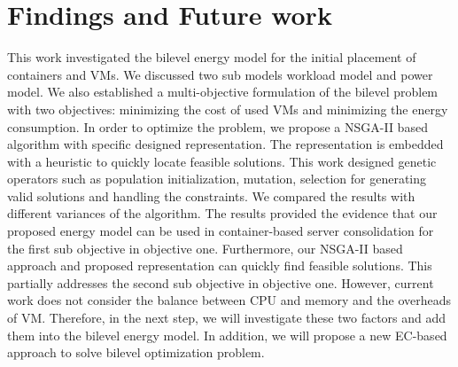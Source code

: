 \section{Findings and Future work}
\label{sec:con}

This work investigated the bilevel energy model for the initial placement of containers and VMs. We discussed two sub models workload model and power model. We also established a multi-objective formulation of the bilevel problem with two objectives: minimizing the cost of used VMs and minimizing the energy consumption. In order to optimize the problem, we propose a NSGA-II based algorithm with specific designed representation. The representation is embedded with a heuristic to quickly locate feasible solutions. This work designed genetic operators such as population initialization, mutation, selection for generating valid solutions and handling the constraints. We compared the results with different variances of the algorithm. The results provided the evidence that our proposed energy model can be used in container-based server consolidation for the first sub objective in objective one. Furthermore, our NSGA-II based approach and proposed representation can quickly find feasible solutions. This partially addresses the second sub objective in objective one. However, current work does not consider the balance between CPU and memory and the overheads of VM. Therefore, in the next step, we will investigate these two factors and add them into the bilevel energy model. In addition, we will propose a new EC-based approach to solve bilevel optimization problem.

